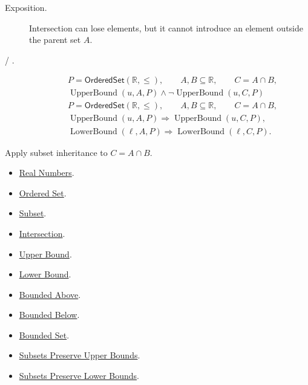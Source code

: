 \begin{remark*}
\begin{description}
\item[Exposition.]
Intersection can lose elements, but it cannot introduce an element outside the
parent set $A$.


  \item[ / .]

\[
\begin{aligned}
&P=\mathsf{OrderedSet}(\mathbb{R},\leq),\qquad A,B\subseteq\mathbb{R},\qquad C=A\cap B,\\
&\operatorname{UpperBound}(u,A,P)\land
\neg\operatorname{UpperBound}(u,C,P)
\end{aligned}
\]
\[
\begin{aligned}
&P=\mathsf{OrderedSet}(\mathbb{R},\leq),\qquad A,B\subseteq\mathbb{R},\qquad C=A\cap B,\\
&\operatorname{UpperBound}(u,A,P)\Longrightarrow\operatorname{UpperBound}(u,C,P),\\
&\operatorname{LowerBound}(\ell,A,P)\Longrightarrow\operatorname{LowerBound}(\ell,C,P).
\end{aligned}
\]
\end{description}
\end{remark*}

\begin{remark*}[Interpretation]
Apply subset inheritance to $C=A\cap B$.
\end{remark*}

\begin{dependencies}
\begin{itemize}
\item \hyperref[def:reals]{Real Numbers}.
\item \hyperref[def:ordered-set]{Ordered Set}.
\item \hyperref[def:subset]{Subset}.
\item \hyperref[def:intersection]{Intersection}.
\item \hyperref[def:real-upper-bound]{Upper Bound}.
\item \hyperref[def:real-lower-bound]{Lower Bound}.
\item \hyperref[def:bounded-above]{Bounded Above}.
\item \hyperref[def:bounded-below]{Bounded Below}.
\item \hyperref[def:bounded]{Bounded Set}.
\item \hyperref[lem:subsets-preserve-upper-bounds]{Subsets Preserve Upper Bounds}.
\item \hyperref[lem:subsets-preserve-lower-bounds]{Subsets Preserve Lower Bounds}.
\end{itemize}
\end{dependencies}

